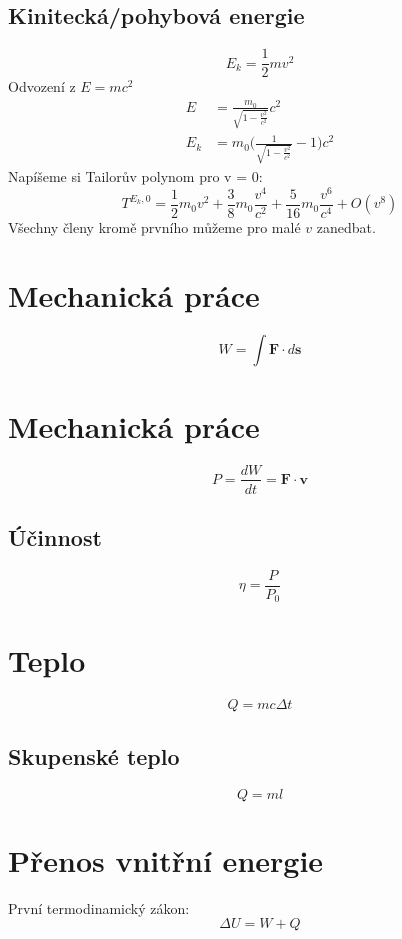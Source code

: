\documentclass[titlepage]{book}
\begin{document}
\subsection{Kinitecká/pohybová energie}
\begin{equation}
E_k = \frac{1}{2}mv^2
\end{equation}
Odvození z $E = mc^2$
\begin{align}
E &= \frac{m_0}{\sqrt{1 - \frac{v^2}{c^2}}}c^2\\
E_k &= m_0 \Big(\frac{1}{\sqrt{1 - \frac{v^2}{c^2}}} - 1\Big)c^2
\end{align}
Napíšeme si Tailorův polynom pro v = 0:
\begin{equation}
T^{E_k,0} = \frac{1}{2}m_0v^2 + \frac{3}{8}m_0\frac{v^4}{c^2} + \frac{5}{16}m_0\frac{v^6}{c^4} + O(v^8)
\end{equation}
Všechny členy kromě prvního můžeme pro malé $v$ zanedbat.
\section{Mechanická práce}
\begin{equation}
W = \int \boldsymbol F \cdot d\boldsymbol s
\end{equation}
\section{Mechanická práce}
\begin{equation}
P = \frac{dW}{dt} = \boldsymbol F \cdot \boldsymbol v
\end{equation}
\subsection{Účinnost}
\begin{equation}
\eta = \frac{P}{P_0}
\end{equation}
\section{Teplo}
\begin{equation}
Q = mc\Delta t
\end{equation}
\subsection{Skupenské teplo}
\begin{equation}
Q = m l
\end{equation}
\section{Přenos vnitřní energie}
První termodinamický zákon:
\begin{equation}
\Delta U = W + Q
\end{equation}
\end{document}
